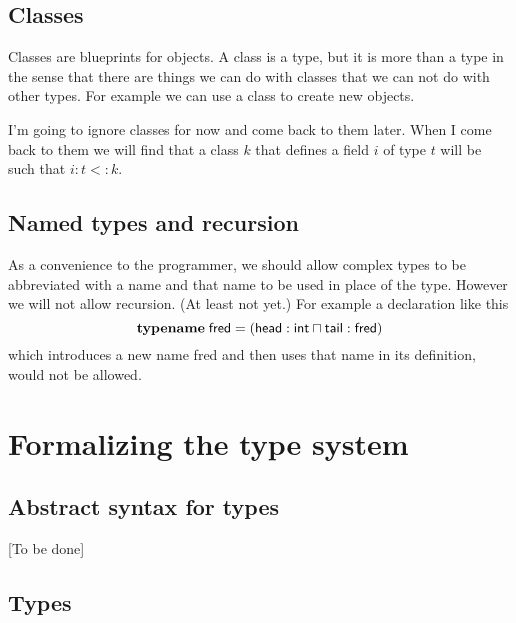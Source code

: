 \documentclass[12pt]{article}
\begin{document}
\subsection{Classes}

Classes are blueprints for objects. A class is a type, but it is more than a
type in the sense that there are things we can do with classes that we can
not do with other types. For example we can use a class to create new
objects.

I'm going to ignore classes for now and come back to them later. When I come
back to them we will find that a class $k$ that defines a field $i$ of type $%
t$ will be such that $i\colon t<:k$.

\subsection{Named types and recursion}

As a convenience to the programmer, we should allow complex types to be
abbreviated with a name and that name to be used in place of the type.
However we will not allow recursion. (At least not yet.) For example a
declaration like this%
\begin{equation*}
\mathbf{typename}\;\mathsf{fred}=(\mathsf{head}:\mathsf{int}\sqcap \mathsf{%
tail}:\mathsf{fred)}
\end{equation*}%
which introduces a new name \textsf{fred} and then uses that name in its
definition, would not be allowed.

\section{Formalizing the type system}

\subsection{Abstract syntax for types\label{sec:type-syntax}}

[To be done]

\subsection{Types}
\end{document}
